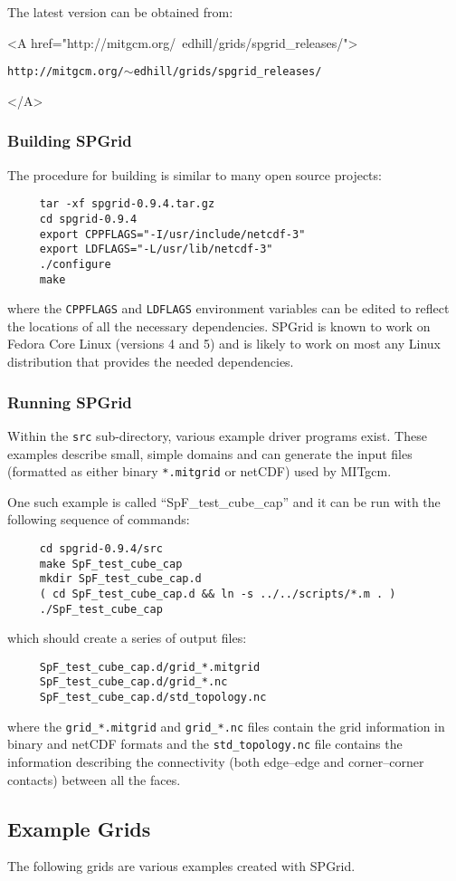 The latest version can be obtained from:
\begin{center}
  \begin{rawhtml}
     <A href="http://mitgcm.org/~edhill/grids/spgrid_releases/">
  \end{rawhtml}
  \texttt{http://mitgcm.org/$\sim$edhill/grids/spgrid\_releases/}
  \begin{rawhtml} </A> \end{rawhtml}
\end{center}


\subsubsection{Building SPGrid}

The procedure for building is similar to many open source projects:
\begin{verbatim}
     tar -xf spgrid-0.9.4.tar.gz
     cd spgrid-0.9.4
     export CPPFLAGS="-I/usr/include/netcdf-3"
     export LDFLAGS="-L/usr/lib/netcdf-3"
     ./configure
     make
\end{verbatim}
where the \texttt{CPPFLAGS} and \texttt{LDFLAGS} environment variables
can be edited to reflect the locations of all the necessary
dependencies.  SPGrid is known to work on Fedora Core Linux (versions
4 and 5) and is likely to work on most any Linux distribution that
provides the needed dependencies.


\subsubsection{Running SPGrid}

Within the \texttt{src} sub-directory, various example driver programs
exist.  These examples describe small, simple domains and can generate
the input files (formatted as either binary \texttt{*.mitgrid} or
netCDF) used by MITgcm.

One such example is called ``SpF\_test\_cube\_cap'' and it can be run
with the following sequence of commands:
\begin{verbatim}
     cd spgrid-0.9.4/src
     make SpF_test_cube_cap
     mkdir SpF_test_cube_cap.d
     ( cd SpF_test_cube_cap.d && ln -s ../../scripts/*.m . )
     ./SpF_test_cube_cap
\end{verbatim}
which should create a series of output files:
\begin{verbatim}
     SpF_test_cube_cap.d/grid_*.mitgrid
     SpF_test_cube_cap.d/grid_*.nc
     SpF_test_cube_cap.d/std_topology.nc
\end{verbatim}
where the \texttt{grid\_*.mitgrid} and \texttt{grid\_*.nc} files
contain the grid information in binary and netCDF formats and the
\texttt{std\_topology.nc} file contains the information describing the
connectivity (both edge--edge and corner--corner contacts) between all
the faces.


\subsection{Example Grids}

The following grids are various examples created with SPGrid. 
